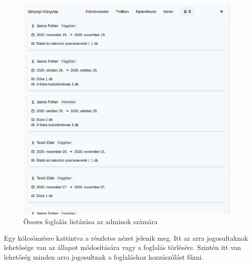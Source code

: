 \begin{figure}[!ht]
  \centering
  \includegraphics[width=150mm, keepaspectratio]{figures/order-admin-list.png}
  \caption{Összes foglalás listázása az adminok számára}
  \label{fig:OrderAdminList}
\end{figure}

Egy kölcsönzésre kattintva a részletes nézet jelenik meg. Itt az arra jogosultaknak lehetősége van az állapot módosítására vagy
a foglalás törlésére. Szintén itt van lehetőség minden arra jogosultnak a foglaláshoz hozzászólást fűzni.

